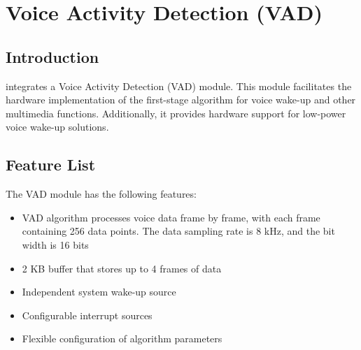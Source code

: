 \documentclass[main\_\_EN.tex]{subfiles}
\begin{document}

\ifglobal
\else
    {\let\clearpage\relax \listoftodos}
    {\let\clearpage\relax \listofdonetodos}
    \tableofcontents
\fi



\hypertarget{vad}{}
\chapter{Voice Activity Detection (VAD)}
\label{mod:vad}

\section{Introduction}

\chipname{} integrates a Voice Activity Detection (VAD) module. This module facilitates the hardware implementation of the first-stage algorithm for voice wake-up and other multimedia functions. Additionally, it provides hardware support for low-power voice wake-up solutions.




\section{Feature List}
\label{sec:vad-features}

The VAD module has the following features:

\begin{itemize}
    \item VAD algorithm processes voice data frame by frame, with each frame containing 256 data points. The data sampling rate is 8 kHz, and the bit width is 16 bits
    \item 2 KB buffer that stores up to 4 frames of data
    \item Independent system wake-up source
    \item Configurable interrupt sources
    \item Flexible configuration of algorithm parameters
\end{itemize}
\end{document}
